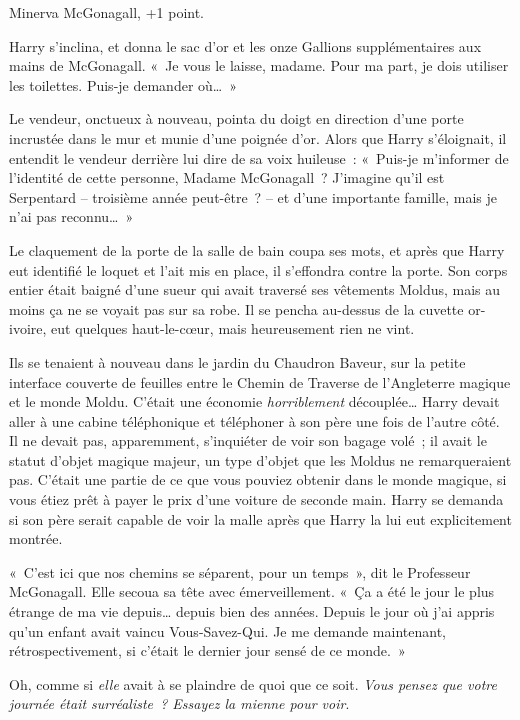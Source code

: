 Minerva McGonagall, +1 point.

Harry s'inclina, et donna le sac d'or et les onze Gallions supplémentaires aux mains de McGonagall. «~Je vous le laisse, madame. Pour ma part, je dois utiliser les toilettes. Puis-je demander où…~»

Le vendeur, onctueux à nouveau, pointa du doigt en direction d'une porte incrustée dans le mur et munie d'une poignée d'or. Alors que Harry s'éloignait, il entendit le vendeur derrière lui dire de sa voix huileuse~: «~Puis-je m'informer de l'identité de cette personne, Madame McGonagall~? J'imagine qu'il est Serpentard -- troisième année peut-être~? -- et d'une importante famille, mais je n'ai pas reconnu…~»

Le claquement de la porte de la salle de bain coupa ses mots, et après que Harry eut identifié le loquet et l'ait mis en place, il s'effondra contre la porte. Son corps entier était baigné d'une sueur qui avait traversé ses vêtements Moldus, mais au moins ça ne se voyait pas sur sa robe. Il se pencha au-dessus de la cuvette or-ivoire, eut quelques haut-le-cœur, mais heureusement rien ne vint.

\later

Ils se tenaient à nouveau dans le jardin du Chaudron Baveur, sur la petite interface couverte de feuilles entre le Chemin de Traverse de l'Angleterre magique et le monde Moldu. C'était une économie \emph{horriblement} découplée… Harry devait aller à une cabine téléphonique et téléphoner à son père une fois de l'autre côté. Il ne devait pas, apparemment, s'inquiéter de voir son bagage volé~; il avait le statut d'objet magique majeur, un type d'objet que les Moldus ne remarqueraient pas. C'était une partie de ce que vous pouviez obtenir dans le monde magique, si vous étiez prêt à payer le prix d'une voiture de seconde main. Harry se demanda si son père serait capable de voir la malle après que Harry la lui eut explicitement montrée.

«~C'est ici que nos chemins se séparent, pour un temps~», dit le Professeur McGonagall. Elle secoua sa tête avec émerveillement. «~Ça a été le jour le plus étrange de ma vie depuis… depuis bien des années. Depuis le jour où j'ai appris qu'un enfant avait vaincu Vous-Savez-Qui. Je me demande maintenant, rétrospectivement, si c'était le dernier jour sensé de ce monde.~»

Oh, comme si \emph{elle} avait à se plaindre de quoi que ce soit. \emph{Vous pensez que votre journée était surréaliste~? Essayez la mienne pour voir}.

